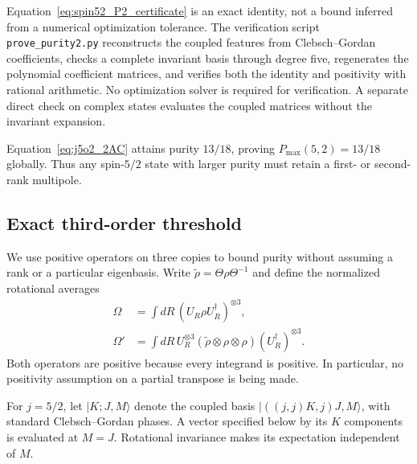 \documentclass[11pt]{article}
\begin{document}
Equation~\eqref{eq:spin52_P2_certificate} is an exact identity, not
a bound inferred from a numerical optimization tolerance.
The verification script \texttt{prove\_purity2.py} reconstructs the
coupled features from Clebsch--Gordan coefficients, checks a complete
invariant basis through degree five, regenerates the polynomial
coefficient matrices, and verifies both the identity and positivity
with rational arithmetic. No optimization solver is required for
verification. A separate direct check on complex states evaluates the
coupled matrices without the invariant expansion.

Equation~\eqref{eq:j5o2_2AC} attains purity $13/18$, proving
$P_{\max}(5,2)=13/18$ globally. Thus any spin-$5/2$ state with
larger purity must retain a first- or second-rank multipole.

\subsection{Exact third-order threshold}
We use positive operators on three copies to bound purity without assuming a rank or a particular eigenbasis. Write $\widetilde\rho=\Theta\rho\Theta^{-1}$ and define the normalized rotational averages
\begin{align}
 \Omega&=\int dR\,(U_R\rho U_R^\dagger)^{\otimes3},\\
 \Omega'&=\int dR\,U_R^{\otimes3}
 (\widetilde\rho\otimes\rho\otimes\rho)
 (U_R^\dagger)^{\otimes3}.
\end{align}
Both operators are positive because every integrand is positive. In particular, no positivity assumption on a partial transpose is being made.

For $j=5/2$, let $|K;J,M\rangle$ denote the coupled basis $|((j,j)K,j)J,M\rangle$, with standard Clebsch--Gordan phases. A vector specified below by its $K$ components is evaluated at $M=J$. Rotational invariance makes its expectation independent of $M$.
\end{document}
